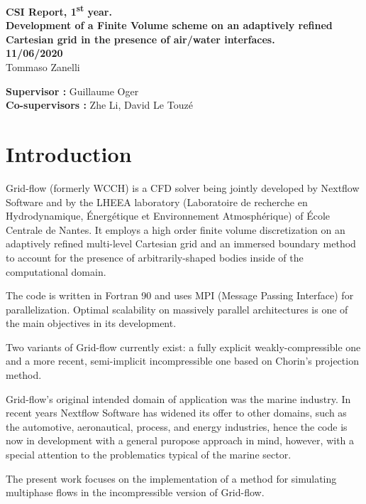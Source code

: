 \documentclass[11pt, a4paper, oneside, openany]{book}
\begin{document}
\begin{titlepage}
\begin{figure}[!ht]
\begin{subfigure}{.5\textwidth}
\end{subfigure}
 \vspace{3cm}
\end{figure}\noindent
{\LARGE \textbf{CSI Report, 1\textsuperscript{st} year.\vspace{0.2cm}\\
Development of a Finite Volume scheme on an adaptively refined Cartesian grid in the presence of air/water interfaces.}} \\
\vspace{1cm}
{\large\textbf{11/06/2020}}\\
\vspace{2em}
{\large Tommaso Zanelli} \\
\vfill
\begin{flushleft}
\textbf{Supervisor :}\: Guillaume Oger \\
\textbf{Co-supervisors :}\:  Zhe Li, David Le Touz{\'{e}}
\end{flushleft}
 \end{titlepage}

\tableofcontents
{}
\listoffigures
{}
\mainmatter
\chapter{Introduction}\label{Chapter_Introduction}
Grid-flow (formerly WCCH) is a CFD solver being jointly developed by Nextflow Software and by the LHEEA laboratory (Laboratoire de recherche en Hydrodynamique, Énergétique et Environnement Atmosphérique) of École Centrale de Nantes. It employs a high order finite volume discretization on an adaptively refined multi-level Cartesian grid and an immersed boundary method to account for the presence of arbitrarily-shaped bodies inside of the computational domain.\par
The code is written in Fortran 90 and uses MPI (Message Passing Interface) for parallelization. Optimal scalability on massively parallel architectures is one of the main objectives in its development.\par
Two variants of Grid-flow currently exist: a fully explicit weakly-compressible one and a more recent, semi-implicit incompressible one based on Chorin's projection method.\par
Grid-flow's original intended domain of application was the marine industry. In recent years Nextflow Software has widened its offer to other domains, such as the automotive, aeronautical, process, and energy industries, hence the code is now in development with a general puropose approach in mind, however, with a special attention to the problematics typical of the marine sector.\par
The present work focuses on the implementation of a method for simulating multiphase flows in the incompressible version of Grid-flow.
\end{document}
